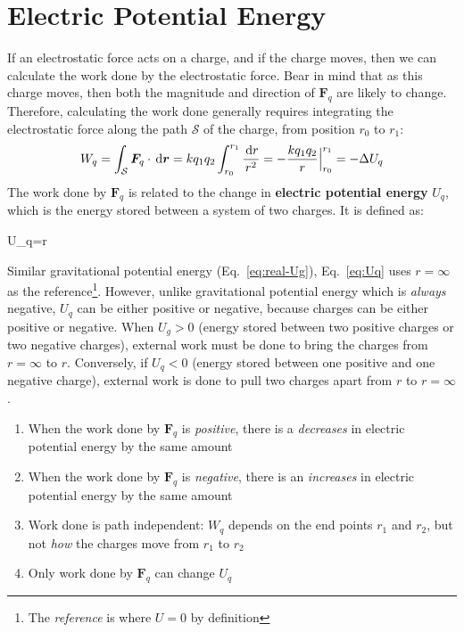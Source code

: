 \section{Electric Potential Energy}
If an electrostatic force acts on a charge, and if the charge moves, then we
can calculate the work done by the electrostatic force. Bear in mind that as
this charge moves, then both the magnitude and direction of $\bm F_q$ are
likely to change. Therefore, calculating the work done generally requires
integrating the electrostatic force along the path $\mathcal S$ of the charge,
from position $r_0$ to $r_1$:
\begin{equation}
  W_q=\int_{\mathcal S}\bm F_q\cdot\dl{\bm r}
  =kq_1q_2\int_{r_0}^{r_1}\frac{\dl r}{r^2}
  =-\frac{kq_1q_2} r\Big|^{r_1}_{r_0}=-\Delta U_q
\end{equation}
The work done by $\bm F_q$ is related to the change in
\textbf{electric potential energy} $U_q$, which is the energy stored between a
system of two charges. It is defined as:
\begin{important-equation}
  U_q=r
  \label{eq:Uq}
\end{important-equation}
Similar gravitational potential energy (Eq.~\ref{eq:real-Ug}),
Eq.~\ref{eq:Uq} uses  $r=\infty$ as the reference\footnote{The \emph{reference}
is where $U=0$ by definition}. However, unlike gravitational potential energy
which is \emph{always} negative, $U_q$ can be either positive or negative,
because charges can be either positive or negative. When $U_g>0$ (energy stored
between two positive charges or two negative charges), external work must be
done to bring the charges from $r=\infty$ to $r$. Conversely, if $U_q<0$
(energy stored between one positive and one negative charge), external work is
done to pull two charges apart from $r$ to $r=\infty$.
\begin{definition}
  \begin{enumerate}[leftmargin=15pt]
  \item When the work done by $\bm F_q$ is \emph{positive}, there is a
    \emph{decreases} in electric potential energy by the same amount
  \item When the work done by $\bm F_q$ is \emph{negative}, there is an
    \emph{increases} in electric potential energy by the same amount
  \item Work done is path independent: $W_q$ depends on the end points $r_1$ and
    $r_2$, but not \emph{how} the charges move from $r_1$ to $r_2$
  \item Only work done by $\bm F_q$ can change $U_q$
  \end{enumerate}
\end{definition}


